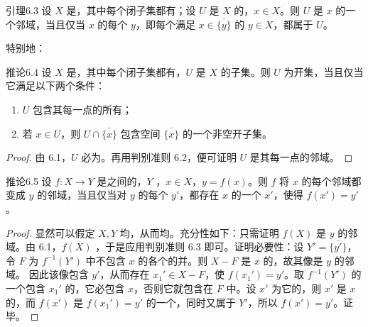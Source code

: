 \begin{SGAresult}{引理}{6.3}
设 $X$ 是，其中每个闭子集都有；设 $U$ 是 $X$ 的，$x\in X$。则 $U$ 是 $x$ 的一个邻域，当且仅当 $x$ 的每个 $y$，即每个满足 $x\in\overline{\{y\}}$ 的 $y\in X$，都属于 $U$。
\end{SGAresult}
特别地：
\begin{SGAresult}{推论}{6.4}
设 $X$ 是，其中每个闭子集都有，$U$ 是 $X$ 的子集。则 $U$ 为开集，当且仅当它满足以下两个条件：
\begin{enumerate}
\item[(a)] $U$ 包含其每一点的所有；
\item[(b)] 若 $x\in U$，则 $U\cap\overline{\{x\}}$ 包含空间 $\overline{\{x\}}$ 的一个非空开子集。
\end{enumerate}
\end{SGAresult}
\begin{proof}
由 6.1，$U$ 必为。再用判别准则 6.2，便可证明 $U$ 是其每一点的邻域。
\end{proof}

\begin{SGAresult}{推论}{6.5}
设 $f:X\to Y$ 是之间的，$Y$ ，$x\in X$，$y=f(x)$。则 $f$ 将 $x$ 的每个邻域都变成 $y$ 的邻域，当且仅当对 $y$ 的每个 $y'$，都存在 $x$ 的一个 $x'$，使得 $f(x')=y'$。
\end{SGAresult}
\begin{proof}
显然可以假定 $X,Y$ 均，从而均。充分性如下：只需证明 $f(X)$ 是 $y$ 的邻域。由 6.1，$f(X)$ ，于是应用判别准则 6.3 即可。证明必要性：设 $Y'=\overline{\{y'\}}$，令 $F$ 为 $f^{-1}(Y')$ 中不包含 $x$ 的各个的并。则 $X-F$ 是 $x$ 的，故其像是 $y$ 的邻域。
因此该像包含 $y'$，从而存在 $x_1'\in X-F$，使 $f(x_1')=y'$。取 $f^{-1}(Y')$ 的一个包含 $x_1'$ 的，它必包含 $x$，否则它就包含在 $F$ 中。设 $x'$ 为它的，则 $x'$ 是 $x$ 的，而 $f(x')$ 是 $f(x_1')=y'$ 的一个，同时又属于 $Y'$，所以 $f(x')=y'$。证毕。
\end{proof}

